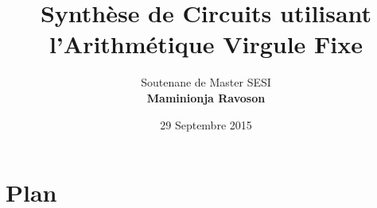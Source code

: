 \documentclass[blue]{beamer}
\title[Synthèse de Circuits - FxP]{Synthèse de Circuits utilisant l’Arithmétique Virgule Fixe}
\author[Maminionja Ravoson]{Soutenane de Master SESI \\\textbf{Maminionja Ravoson}}
\institute[Master SESI]{Roselyne Chotin-Avot / Thibault Hilaire}
\date{29 Septembre 2015}
\begin{document}


\section*{Plan}
\hspace*{2cm}
\frame{\tableofcontents}






%
\end{document}
